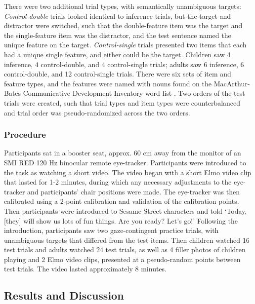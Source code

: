 \documentclass[10pt,letterpaper]{article}
\begin{document}
There were two additional trial types, with semantically unambiguous targets: \emph{Control-double} trials looked identical to inference trials, but the target and distractor were switched, such that the double-feature item was the target and the single-feature item was the distractor, and the test sentence named the unique feature on the target. \emph{Control-single} trials presented two items that each had a unique single feature, and either could be the target. Children saw 4 inference, 4 control-double, and 4 control-single trials; adults saw 6 inference, 6 control-double, and 12 control-single trials. 
There were six sets of item and feature types, and the features were named with nouns found on the  MacArthur-Bates Communicative Development Inventory word list \cite{fenson1994variability}. Two orders of the test trials were created, such that trial types and item types were counterbalanced and trial order was pseudo-randomized across the two orders.

\subsubsection{Procedure}

Participants sat in a booster seat, approx. 60 cm away from the monitor of an SMI RED 120 Hz binocular remote eye-tracker. Participants were introduced to the task as watching a short video. The video began with a short Elmo video clip that lasted for 1-2 minutes, during which any necessary adjustments to the eye-tracker and participants' chair positions were made. The eye-tracker was then calibrated using a 2-point calibration and validation of the calibration points. Then participants were introduced to Sesame Street characters and told `Today, [they] will show us lots of fun things. Are you ready? Let's go!' Following the introduction, participants saw two gaze-contingent practice trials, with unambiguous targets that differed from the test items. Then children watched 16 test trials and adults watched 24 test trials, as well as 4 filler photos of children playing and 2 Elmo video clips, presented at a pseudo-random points between test trials. The video lasted approximately 8 minutes.

\subsection{Results and Discussion}
\end{document}
